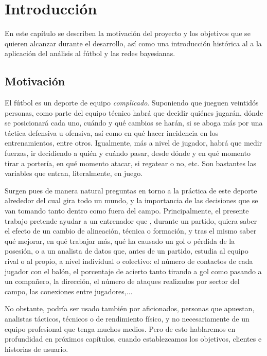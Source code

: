 \chapter{Introducción}

En este capítulo se describen la motivación del proyecto y los objetivos que
se quieren alcanzar durante el desarrollo, así como una introducción histórica al
a la aplicación del análisis al fútbol y las redes bayesianas. 

\section{Motivación}

El fútbol es un deporte de equipo  \textit{complicado}. Suponiendo que 
jueguen veintidós personas, como parte del equipo técnico habrá que 
decidir quiénes jugarán, dónde se posicionará cada uno, cuándo y qué 
cambios se harán, si se aboga más por una táctica defensiva u ofensiva, 
así como en qué hacer incidencia en los entrenamientos, entre otros. 
Igualmente, más a nivel de jugador, habrá que medir fuerzas, ir 
decidiendo a quién y cuándo pasar, desde dónde y en qué momento 
tirar a portería, en qué momento atacar, si regatear o no, etc. 
Son bastantes las variables que entran, literalmente, en juego. 

Surgen pues de manera natural preguntas en torno a la práctica de 
este deporte alrededor del cual gira todo un mundo, y la importancia 
de las decisiones que se van tomando tanto dentro como fuera del 
campo. Principalmente,  el presente trabajo pretende ayudar a un 
entrenador que , durante un partido, quiera saber el efecto de un 
cambio de alineación, técnica o formación, y tras el mismo saber 
qué mejorar, en qué trabajar más, qué ha causado un gol o pérdida 
de la posesión, o a un analista de datos que, antes de un partido, 
estudia al equipo rival o al propio, a nivel individual o colectivo: 
el número de contactos de cada jugador con el balón, el porcentaje 
de acierto tanto tirando a gol como pasando a un compañero, la 
dirección, el número de ataques realizados por sector del campo, 
las conexiones entre jugadores,...

No obstante, podría ser usado también por aficionados, personas que apuestan, analistas tácticos, técnicos o de rendimiento físico, y no necesariamente de un equipo profesional que tenga muchos medios. Pero de esto hablaremos en profundidad en próximos capítulos, cuando establezcamos los objetivos, clientes e historias de usuario.

